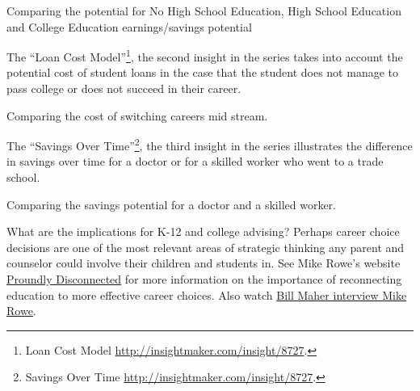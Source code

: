 \documentclass[]{memoir}
\begin{document}
\FloatBarrier 

\begin{model}[frametitle={Model: Traditional Career Model}] 

 Comparing the potential for No High School Education, High School Education and College Education earnings/savings potential




 \end{model}

The ``Loan Cost Model''\footnote{Loan Cost Model
  \href{http://insightmaker.com/insight/8729}{http://insightmaker.com/insight/8727}.},
the second insight in the series takes into account the potential cost
of student loans in the case that the student does not manage to pass
college or does not succeed in their career.

\FloatBarrier 

\begin{model}[frametitle={Model: Loans Cost}] 

 Comparing the cost of switching careers mid stream.




 \end{model}

The ``Savings Over Time''\footnote{Savings Over Time
  \href{http://insightmaker.com/insight/8735}{http://insightmaker.com/insight/8727}.},
the third insight in the series illustrates the difference in savings
over time for a doctor or for a skilled worker who went to a trade
school.

\FloatBarrier 

\begin{model}[frametitle={Model: Savings Over Time}] 

 Comparing the savings potential for a doctor and a skilled worker.




 \end{model}

What are the implications for K-12 and college advising? Perhaps career
choice decisions are one of the most relevant areas of strategic
thinking any parent and counselor could involve their children and
students in. See Mike Rowe's website
\href{http://profoundlydisconnected.com/alternative-education/}{Proundly
Disconnected} for more information on the importance of reconnecting
education to more effective career choices. Also watch
\href{http://roadshow.slate.com/mike-rowe-on-bill-maher-time-to-close-the-skills-gap/}{Bill
Maher interview Mike Rowe}.
\end{document}
